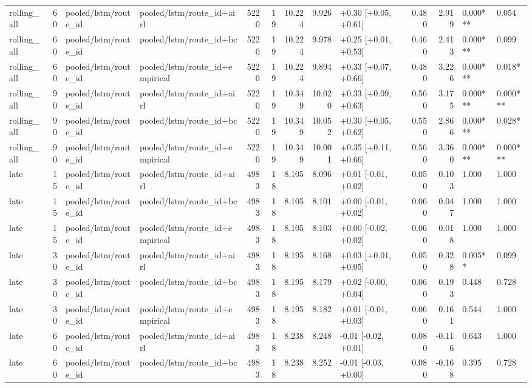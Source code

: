 \begin{tabular}{lrllrrrrlrrll}
rolling_all & 60 & pooled/lstm/route_id & pooled/lstm/route_id+airl & 5220 & 19 & 10.224 & 9.926 & +0.30 [+0.05, +0.61] & 0.480 & 2.919 & 0.000*** & 0.054 \\
rolling_all & 60 & pooled/lstm/route_id & pooled/lstm/route_id+bc & 5220 & 19 & 10.224 & 9.978 & +0.25 [+0.01, +0.53] & 0.460 & 2.413 & 0.000*** & 0.099 \\
rolling_all & 60 & pooled/lstm/route_id & pooled/lstm/route_id+empirical & 5220 & 19 & 10.224 & 9.894 & +0.33 [+0.07, +0.66] & 0.480 & 3.226 & 0.000*** & 0.018* \\
rolling_all & 90 & pooled/lstm/route_id & pooled/lstm/route_id+airl & 5220 & 19 & 10.349 & 10.020 & +0.33 [+0.09, +0.63] & 0.560 & 3.175 & 0.000*** & 0.000*** \\
rolling_all & 90 & pooled/lstm/route_id & pooled/lstm/route_id+bc & 5220 & 19 & 10.349 & 10.052 & +0.30 [+0.05, +0.62] & 0.550 & 2.866 & 0.000*** & 0.028* \\
rolling_all & 90 & pooled/lstm/route_id & pooled/lstm/route_id+empirical & 5220 & 19 & 10.349 & 10.001 & +0.35 [+0.11, +0.66] & 0.560 & 3.360 & 0.000*** & 0.000*** \\
late & 15 & pooled/lstm/route_id & pooled/lstm/route_id+airl & 4983 & 18 & 8.105 & 8.096 & +0.01 [-0.01, +0.02] & 0.050 & 0.103 & 1.000 & 1.000 \\
late & 15 & pooled/lstm/route_id & pooled/lstm/route_id+bc & 4983 & 18 & 8.105 & 8.101 & +0.00 [-0.01, +0.02] & 0.060 & 0.047 & 1.000 & 1.000 \\
late & 15 & pooled/lstm/route_id & pooled/lstm/route_id+empirical & 4983 & 18 & 8.105 & 8.103 & +0.00 [-0.02, +0.02] & 0.060 & 0.018 & 1.000 & 1.000 \\
late & 30 & pooled/lstm/route_id & pooled/lstm/route_id+airl & 4983 & 18 & 8.195 & 8.168 & +0.03 [+0.01, +0.05] & 0.050 & 0.328 & 0.005** & 0.099 \\
late & 30 & pooled/lstm/route_id & pooled/lstm/route_id+bc & 4983 & 18 & 8.195 & 8.179 & +0.02 [-0.00, +0.04] & 0.060 & 0.193 & 0.448 & 0.728 \\
late & 30 & pooled/lstm/route_id & pooled/lstm/route_id+empirical & 4983 & 18 & 8.195 & 8.182 & +0.01 [-0.01, +0.03] & 0.060 & 0.161 & 0.544 & 1.000 \\
late & 60 & pooled/lstm/route_id & pooled/lstm/route_id+airl & 4983 & 18 & 8.238 & 8.248 & -0.01 [-0.02, +0.01] & 0.080 & -0.116 & 0.643 & 1.000 \\
late & 60 & pooled/lstm/route_id & pooled/lstm/route_id+bc & 4983 & 18 & 8.238 & 8.252 & -0.01 [-0.03, +0.00] & 0.080 & -0.168 & 0.395 & 0.728 \\

\end{tabular}
